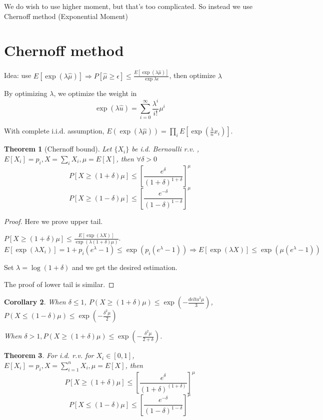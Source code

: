 \documentclass{book}
\newtheorem{Thm}{Theorem}[section]
\newtheorem{Cor}[Thm]{Corollary}
\begin{document}
We do wish to use higher moment, but that's too complicated. So instead we use Chernoff method (Exponential Moment)

\section{Chernoff method}
Idea: use $E[\exp(\lambda\hat\mu)]\Rightarrow P[\hat \mu\geq \epsilon]\leq \frac{E[\exp(\lambda\hat\mu)]}{\exp{\lambda\epsilon}}$, then optimize $\lambda$

By optimizing $\lambda$, we optimize the weight in
\[\exp(\lambda\hat u)=\sum_{i=0}^{\infty}{\frac{\lambda^{i}}{i!}\mu^{i}}\]

With complete i.i.d. assumption, $E(\exp(\lambda\hat\mu))=\prod_{i}E[\exp(\frac{\lambda}{n}x_{i})]$.

\begin{Thm}[Chernoff bound]
  Let $\{X_{i}\}$ be i.d. Bernoulli r.v. ,$E[X_{i}]=p_{i},X=\sum_{i}X_{i}, \mu=E[X]$, then $\forall \delta>0$
  \[P[X\geq (1+\delta)\mu]\leq [\frac{e^{\delta}}{(1+\delta)^{1+\delta}}]^{\mu}\]
  \[P[X\geq (1-\delta)\mu]\leq [\frac{e^{-\delta}}{(1-\delta)^{1-\delta}}]^{\mu}\]
\end{Thm}

\begin{proof}
  Here we prove upper tail.
  
  $P[X\geq(1+\delta)\mu]\leq \frac{E[\exp(\lambda X)]}{\exp(\lambda(1+\delta)\mu)}$. $E[\exp(\lambda X_{i})]=1+p_{i}(e^{\lambda}-1)\leq\exp(p_{i}(e^{\lambda}-1))\Rightarrow E[\exp(\lambda X)]\leq \exp(\mu(e^{\lambda}-1))$

  Set $\lambda=\log(1+\delta)$ and we get the desired estimation.

  The proof of lower tail is similar. 
\end{proof}

\begin{Cor}
  When $\delta\leq 1$, $P(X\geq (1+\delta)\mu)\leq \exp(-\frac{delta^{2}\mu}{3})$, $P(X\leq (1-\delta)\mu)\leq \exp(-\frac{\delta^{2}\mu}{2})$

  When $\delta>1, P(X\geq (1+\delta)\mu)\leq \exp(-\frac{\delta^{2}\mu}{2+\delta})$.
\end{Cor}

\begin{Thm}
  For i.d. r.v. for $X_{i}\in[0,1]$, $E[X_{i}]=p_{i}, X=\sum_{i=1}^{n} X_{i},\mu=E[X]$, then
  \[P[X\geq (1+\delta)\mu]\leq [\frac{e^{\delta}}{(1+\delta)^{(1+\delta)}}]^{\mu}\]
  \[P[X\leq (1-\delta)\mu]\leq[\frac{e^{-\delta}}{(1-\delta)^{1-\delta}}]^{\mu}\]
\end{Thm}
\end{document}
